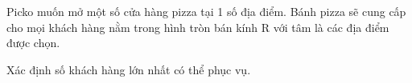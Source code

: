 Picko muốn mở một số cửa hàng pizza tại 1 số địa điểm. Bánh pizza sẽ cung cấp cho mọi khách hàng nằm trong hình tròn bán kính R với tâm là các địa điểm được chọn.  

   Xác định số khách hàng lớn nhất có thể phục vụ.  



\
